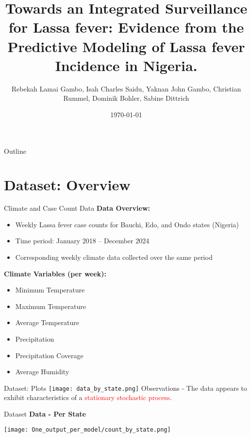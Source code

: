 \documentclass{beamer}
\title[AI Models]{Towards an Integrated Surveillance for Lassa fever: Evidence from the Predictive Modeling of Lassa fever Incidence in Nigeria.}
\author{Rebekah Lamai Gambo, Isah Charles Saidu, Yaknan John Gambo, Christian Rummel, Dominik Bohler, Sabine Dittrich}
\institute{..}
\date{\today}
\begin{document}
\begin{frame}
  \titlepage
\end{frame}

\begin{frame}{Outline}
  \tableofcontents
\end{frame}

\section{Dataset: Overview}
\begin{frame}{Climate and Case Count Data}
\textbf{Data Overview:}
\begin{itemize}
    \item Weekly Lassa fever case counts for Bauchi, Edo, and Ondo states (Nigeria)
    \item Time period: January 2018 – December 2024
    \item Corresponding weekly climate data collected over the same period
\end{itemize}

\vspace{0.5em}
\textbf{Climate Variables (per week):}
\begin{itemize}
    \item Minimum Temperature
    \item Maximum Temperature
    \item Average Temperature
    \item Precipitation
    \item Precipitation Coverage
    \item Average Humidity
\end{itemize}
\end{frame}

\begin{frame}{Dataset: Plots}
  \texttt{[image: data\_by\_state.png]}
\small
   Observations - The data appears to exhibit characteristics of a \textcolor{red}{stationary stochastic process}. 
\end{frame}

\begin{frame}{Dataset}
\textbf{Data  - Per State}
\begin{center}
    \texttt{[image: One\_output\_per\_model/count\_by\_state.png]}
\end{center}
\end{frame}
\end{document}
